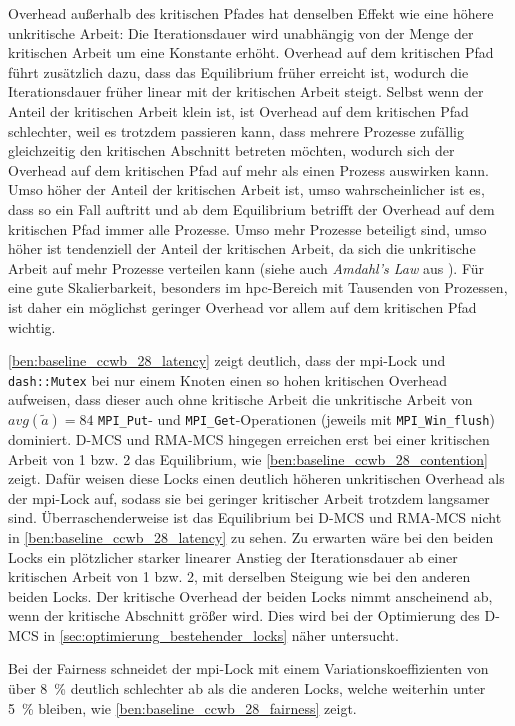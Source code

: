 Overhead außerhalb des kritischen Pfades hat denselben Effekt wie eine höhere unkritische Arbeit:
Die Iterationsdauer wird unabhängig von der Menge der kritischen Arbeit um eine Konstante erhöht.
Overhead auf dem kritischen Pfad führt zusätzlich dazu,
dass das Equilibrium früher erreicht ist,
wodurch die Iterationsdauer früher linear mit der kritischen Arbeit steigt.
Selbst wenn der Anteil der kritischen Arbeit klein ist,
ist Overhead auf dem kritischen Pfad schlechter,
weil es trotzdem passieren kann,
dass mehrere Prozesse zufällig gleichzeitig den kritischen Abschnitt betreten möchten,
wodurch sich der Overhead auf dem kritischen Pfad auf mehr als einen Prozess auswirken kann.
Umso höher der Anteil der kritischen Arbeit ist,
umso wahrscheinlicher ist es,
dass so ein Fall auftritt
und ab dem Equilibrium betrifft der Overhead auf dem kritischen Pfad immer alle Prozesse.
Umso mehr Prozesse beteiligt sind,
umso höher ist tendenziell der Anteil der kritischen Arbeit,
da sich die unkritische Arbeit auf mehr Prozesse verteilen kann (siehe auch \textit{Amdahl's Law} aus \cite{Amdahl's-law}).
Für eine gute Skalierbarkeit,
besonders im \gls{hpc}-Bereich mit Tausenden von Prozessen,
ist daher ein möglichst geringer Overhead vor allem auf dem kritischen Pfad wichtig.

\autoref{ben:baseline_ccwb_28_latency} zeigt deutlich,
dass der \gls{mpi}-Lock und \texttt{dash::Mutex} bei nur einem Knoten einen so hohen kritischen Overhead aufweisen,
dass dieser auch ohne kritische Arbeit die unkritische Arbeit von $avg(\tilde{a}) = 84$ \texttt{MPI\_Put}- und \texttt{MPI\_Get}-Operationen (jeweils mit \texttt{MPI\_Win\_flush}) dominiert.
D-MCS und RMA-MCS hingegen erreichen erst bei einer kritischen Arbeit von 1 bzw. 2 das Equilibrium,
wie \autoref{ben:baseline_ccwb_28_contention} zeigt.
Dafür weisen diese Locks einen deutlich höheren unkritischen Overhead als der \gls{mpi}-Lock auf,
sodass sie bei geringer kritischer Arbeit trotzdem langsamer sind.
Überraschenderweise ist das Equilibrium bei D-MCS und RMA-MCS nicht in \autoref{ben:baseline_ccwb_28_latency} zu sehen.
Zu erwarten wäre bei den beiden Locks ein plötzlicher starker linearer Anstieg der Iterationsdauer ab einer kritischen Arbeit von 1 bzw. 2,
mit derselben Steigung wie bei den anderen beiden Locks.
Der kritische Overhead der beiden Locks nimmt anscheinend ab,
wenn der kritische Abschnitt größer wird.
Dies wird bei der Optimierung des D-MCS in \autoref{sec:optimierung_bestehender_locks} näher untersucht.

Bei der Fairness schneidet der \gls{mpi}-Lock
mit einem Variationskoeffizienten von über 8~\%
deutlich schlechter ab
als die anderen Locks,
welche weiterhin unter 5~\% bleiben,
wie \autoref{ben:baseline_ccwb_28_fairness} zeigt.

